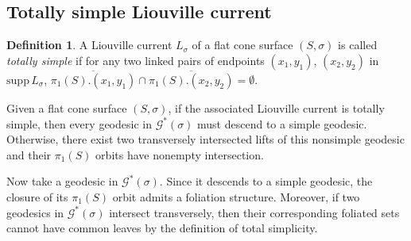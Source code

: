 \documentclass[reqno]{amsart}
\theoremstyle{plain}
\theoremstyle{definition}
\newtheorem{definition}[thm]{Definition}
\theoremstyle{remark}
\theoremstyle{definition}
\newcommand{\?}{\textcolor{red}{?}}
\newcommand{\Gssigma}{\mathcal{G}^*(\sigma) }
\newcommand{\supp}{\mathrm{supp}\, L_\sigma}
\begin{document}
\subsection{Totally simple Liouville current}

\begin{definition}\label{def_totally_simple}
A Liouville current $L_\sigma$ of a flat cone surface $(S,\sigma)$ is called \textit{totally simple} if for any two linked pairs of endpoints $(x_1,y_1)$, $(x_2,y_2)$ in $\supp$, $\overline{\pi_1(S).(x_1,y_1) }\cap \overline{\pi_1(S).(x_2,y_2) }=\emptyset$.
\end{definition}

Given a flat cone surface $(S,\sigma)$, if the associated Liouville current is totally simple, then every geodesic in $\Gssigma$ must descend to a simple geodesic. Otherwise, there exist two transversely intersected lifts of this nonsimple geodesic and their $\pi_1(S)$ orbits have nonempty intersection.

Now take a geodesic in $\Gssigma$. Since it descends to a simple geodesic, the closure of its $\pi_1(S)$ orbit admits a foliation structure. Moreover, if two geodesics in $\Gssigma$ intersect transversely, then their corresponding foliated sets cannot have common leaves by the definition of total simplicity.
\end{document}
